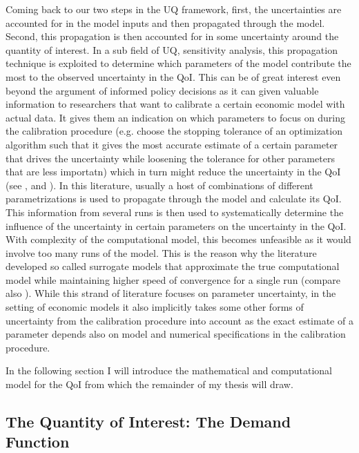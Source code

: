 Coming back to our two steps in the UQ framework, first, the uncertainties are accounted for in the model inputs and then propagated through the model. Second, this propagation is then accounted for in some uncertainty around the quantity of interest. In a sub field of UQ, sensitivity analysis, this propagation technique is exploited to determine which parameters of the model contribute the most to the observed uncertainty in the QoI. This can be of great interest even beyond the argument of informed policy decisions as it can given valuable information to researchers that want to calibrate a certain economic model with actual data. It gives them an indication on which parameters to focus on during the calibration procedure (e.g. choose the stopping tolerance of an optimization algorithm such that it gives the most accurate estimate of a certain parameter that drives the uncertainty while loosening the tolerance for other parameters that are less importatn) which in turn might reduce the uncertainty in the QoI (see \cite{Scheidegger.2019},  \cite{Harenberg.2019} and \cite{Ghanem.2017}). In this literature, usually a host of combinations of different parametrizations is used to propagate through the model and calculate its QoI. This information from several runs is then used to systematically determine the influence of the uncertainty in certain parameters on the uncertainty in the QoI. With complexity of the computational model, this becomes unfeasible as it would involve too many runs of the model. This is the reason why the literature developed so called surrogate models that approximate the true computational model while maintaining higher speed of convergence for a single run (compare also \cite{Saltelli.2008}). While this strand of literature focuses on parameter uncertainty, in the setting of economic models it also implicitly takes some other forms of uncertainty from the calibration procedure into account as the exact estimate of a parameter depends also on model and numerical specifications in the calibration procedure.

In the following section I will introduce the mathematical and computational model for the QoI from which the remainder of my thesis will draw.

\subsection{The Quantity of Interest: The Demand Function}

